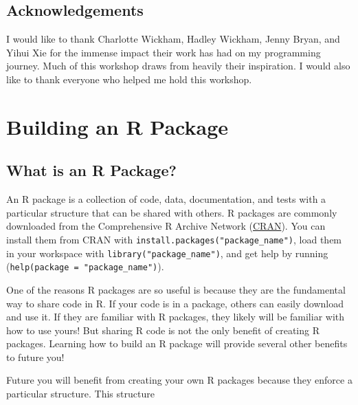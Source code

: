 \documentclass[
]{book}
\begin{document}
\hypertarget{acknowledgements}{%
\section*{Acknowledgements}\label{acknowledgements}}

I would like to thank Charlotte Wickham, Hadley Wickham, Jenny Bryan, and Yihui Xie for the immense impact their work has had on my programming journey. Much of this workshop draws from heavily their inspiration. I would also like to thank everyone who helped me hold this workshop.

\hypertarget{r-package}{%
\chapter{Building an R Package}\label{r-package}}

\hypertarget{what-is-an-r-package}{%
\section{What is an R Package?}\label{what-is-an-r-package}}

An R package is a collection of code, data, documentation, and tests with a particular structure that can be shared with others. R packages are commonly downloaded from the Comprehensive R Archive Network (\href{https://cran.r-project.org/}{CRAN}). You can install them from CRAN with \texttt{install.packages("package\_name")}, load them in your workspace with \texttt{library("package\_name")}, and get help by running (\texttt{help(package\ =\ "package\_name")}).

One of the reasons R packages are so useful is because they are the fundamental way to share code in R. If your code is in a package, others can easily download and use it. If they are familiar with R packages, they likely will be familiar with how to use yours! But sharing R code is not the only benefit of creating R packages. Learning how to build an R package will provide several other benefits to future you!

Future you will benefit from creating your own R packages because they enforce a particular structure. This structure
\end{document}
